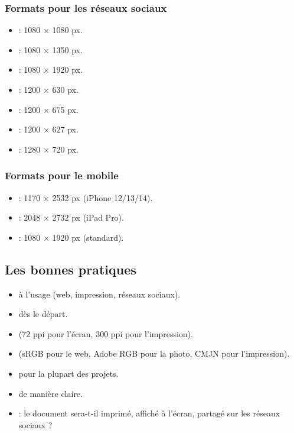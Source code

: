 \subsubsection{Formats pour les réseaux sociaux}

\begin{itemize}
    \item {} : 1080 × 1080 px.
    \item {} : 1080 × 1350 px.
    \item {} : 1080 × 1920 px.
    \item {} : 1200 × 630 px.
    \item {} : 1200 × 675 px.
    \item {} : 1200 × 627 px.
    \item {} : 1280 × 720 px.
\end{itemize}

\subsubsection{Formats pour le mobile}

\begin{itemize}
    \item {} : 1170 × 2532 px (iPhone 12/13/14).
    \item {} : 2048 × 2732 px (iPad Pro).
    \item {} : 1080 × 1920 px (standard).
\end{itemize}

\subsection{Les bonnes pratiques}

\begin{itemize}
    \item {} à l'usage (web, impression, réseaux sociaux).
    \item {} dès le départ.
    \item {} (72 ppi pour l'écran, 300 ppi pour l'impression).
    \item {} (sRGB pour le web, Adobe RGB pour la photo, CMJN pour l'impression).
    \item {} pour la plupart des projets.
    \item {} de manière claire.
    \item {} : le document sera-t-il imprimé, affiché à l'écran, partagé sur les réseaux sociaux ?
\end{itemize}

